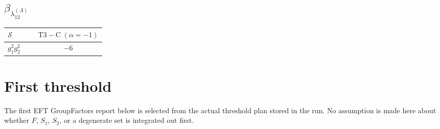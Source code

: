 \documentclass[9pt]{article}
\begin{document}
\subsection*{$ \beta_{\lambda_{12}^{(A)}} $}
\begin{longtable}{@{}p{0.31\linewidth}c@{}}
\toprule
$\mathcal{S}$ & $ \mathrm{T3-C}\;(\alpha=-1) $ \\
\midrule
$ g_1^2g_2^2 $ & $ -6 $ \\
\bottomrule
\end{longtable}
\section*{First threshold}
The first EFT GroupFactors report below is selected from the actual threshold plan stored in the run.  No assumption is made here about whether $F$, $S_1$, $S_2$, or a degenerate set is integrated out first.
\end{document}
